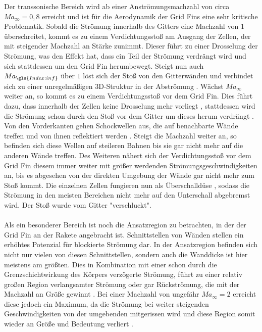 Der transsonische Bereich wird ab einer Anströmungsmachzahl von circa $Ma_\infty=0,8$ erreicht \cite{machgrenzen} und ist für die Aerodynamik der Grid Fins eine sehr kritische Problematik. Sobald die Strömung innerhalb des Gitters eine Machzahl von $1$ überschreitet, kommt es zu einem Verdichtungsstoß am Ausgang der Zellen, der mit steigender Machzahl an Stärke zunimmt. Dieser führt zu einer Drosselung der Strömung, was den Effekt hat, dass ein Teil der Strömung verdrängt wird und sich stattdessen um den Grid Fin herumbewegt. Steigt nun auch $Ma_{\gls{Index:inf}}$ über $1$ löst sich der Stoß von den Gitterwänden und verbindet sich zu einer unregelmäßigen 3D-Struktur in der Abströmung \cite{stroemung}. Wächst $Ma_\infty$ weiter an, so kommt es zu einem Verdichtungsstoß vor dem Grid Fin. Dies führt dazu, dass innerhalb der Zellen keine Drosselung mehr vorliegt \cite{stroemung}, stattdessen wird die Strömung schon durch den Stoß vor dem Gitter um dieses herum verdrängt \cite{synopsis}. Von den Vorderkanten gehen Schockwellen aus, die auf benachbarte Wände treffen und von ihnen reflektiert werden \cite{synopsis}. Steigt die Machzahl weiter an, so befinden sich diese Wellen auf steileren Bahnen bis sie gar nicht mehr auf die anderen Wände treffen. Des Weiteren nähert sich der Verdichtungsstoß vor dem Grid Fin diesem immer weiter mit größer werdenden Strömungsgeschwindigkeiten an, bis es abgesehen von der direkten Umgebung der Wände gar nicht mehr zum Stoß kommt. Die einzelnen Zellen fungieren nun als Überschalldüse \cite{stroemung}, sodass die Strömung in den meisten Bereichen nicht mehr auf den Unterschall abgebremst wird. Der Stoß wurde vom Gitter "verschluckt".
\\~\\
Als ein besonderer Bereich ist noch die Ansatzregion zu betrachten, in der der Grid Fin an der Rakete angebracht ist. Schnittstellen von Wänden stellen ein erhöhtes Potenzial für blockierte Strömung dar. In der Ansatzregion befinden sich nicht nur vielen von diesen Schnittstellen, sondern auch die Wanddicke ist hier meistens am größten. Dies in Kombination mit einer schon durch die Grenzschichtwirkung des Körpers verzögerte Strömung, führt zu einer relativ großen Region verlangsamter Strömung oder gar Rückströmung, die mit der Machzahl an Größe gewinnt \cite{stroemung}. Bei einer Machzahl von ungefähr $Ma_\infty = 2$ erreicht diese jedoch ein Maximum, da die Strömung bei weiter steigenden Geschwindigkeiten von der umgebenden mitgerissen wird und diese Region somit wieder an Größe und Bedeutung verliert \cite{stroemung}.

